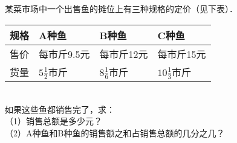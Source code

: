 
某菜市场中一个出售鱼的摊位上有三种规格的定价（见下表）．\\
\begin{tabular}{|l|l|l|l|}
	\hline
	规格\hspace{4em} & A种鱼\hspace{4em} & B种鱼\hspace{4em} & C种鱼\hspace{4em} \\ \hline
	售价 & 每市斤9.5元 & 每市斤12元 & 每市斤15元 \\ \hline
    货量 &  $5\frac{1}{2}$市斤  &  $8\frac{1}{6}$市斤 & $10\frac{1}{3}$市斤 \\ \hline
\end{tabular}\\
如果这些鱼都销售完了，求：\\
（1）销售总额是多少元？\\
（2）A种鱼和B种鱼的销售额之和占销售总额的几分之几？\\

